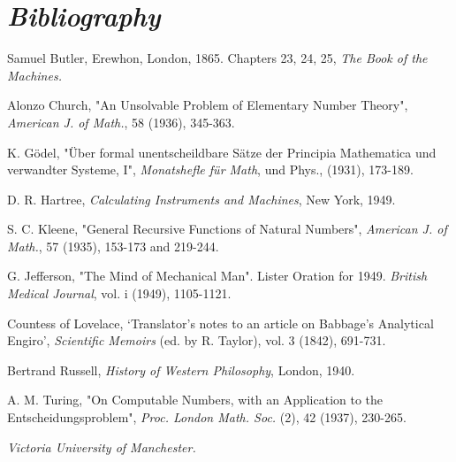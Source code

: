     \section{\textit{Bibliography}}
    
    \begin{hangparas}{3em}{1}
        Samuel Butler, Erewhon, London, 1865. Chapters 23, 24, 25, \textit{The Book of the Machines.}

        Alonzo Church, "An Unsolvable Problem of Elementary Number Theory", \textit{American J. of Math.}, 58 (1936), 345-363.

        K. Gödel, "Über formal unentscheildbare Sätze der Principia Mathematica und verwandter Systeme, I", \textit{Monatshefle für Math}, und Phys., (1931), 173-189.

        D. R. Hartree, \textit{Calculating Instruments and Machines}, New York, 1949.

        S. C. Kleene, "General Recursive Functions of Natural Numbers", \textit{American J. of Math.}, 57 (1935), 153-173 and 219-244.

        G. Jefferson, "The Mind of Mechanical Man". Lister Oration for 1949. \textit{British Medical Journal}, vol. i (1949), 1105-1121.

        Countess of Lovelace, ‘Translator's notes to an article on Babbage's Analytical Engiro', \textit{Scientific Memoirs} (ed. by R. Taylor), vol. 3 (1842), 691-731.

        Bertrand Russell, \textit{History of Western Philosophy}, London, 1940.

        A. M. Turing, "On Computable Numbers, with an Application to the Entscheidungsproblem", \textit{Proc. London Math. Soc.} (2), 42 (1937), 230-265.

        \textit{Victoria University of Manchester.}

    \end{hangparas}